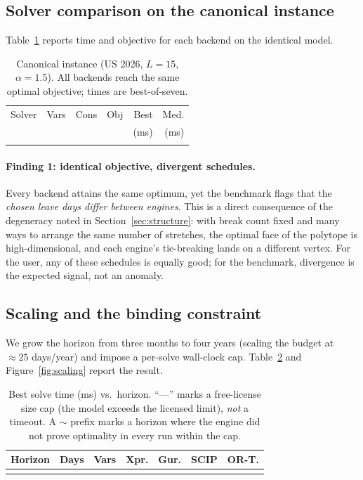 \documentclass[10pt,twocolumn]{article}
\begin{document}
\subsection{Solver comparison on the canonical instance}
Table~\ref{tab:comparison} reports time and objective for each backend on the
identical model.

\begin{table}[t]
  \centering
  \caption{Canonical instance (US 2026, $L=15$, $\alpha=1.5$). All backends
  reach the same optimal objective; times are best-of-seven.}
  \label{tab:comparison}
  \small
  \begin{tabular}{lrrrrr}
    \toprule
    Solver & Vars & Cons & Obj & Best & Med.\\
           &      &      &     & (ms) & (ms)\\
    \midrule
     \\
    \bottomrule
  \end{tabular}
\end{table}

\paragraph{Finding 1: identical objective, divergent schedules.}
Every backend attains the same optimum, yet the benchmark flags that the
\emph{chosen leave days differ between engines}. This is a direct consequence of
the degeneracy noted in Section~\ref{sec:structure}: with break count fixed and
many ways to arrange the same number of stretches, the optimal face of the
polytope is high-dimensional, and each engine's tie-breaking lands on a
different vertex. For the user, any of these schedules is equally good; for the
benchmark, divergence is the expected signal, not an anomaly.

\subsection{Scaling and the binding constraint}
We grow the horizon from three months to four years (scaling the budget at
$\approx 25$ days/year) and impose a per-solve wall-clock cap.
Table~\ref{tab:scaling} and Figure~\ref{fig:scaling} report the result.

\begin{table}[t]
  \centering
  \caption{Best solve time (ms) vs.\ horizon. ``---'' marks a free-license size
  cap (the model exceeds the licensed limit), \emph{not} a timeout. A
  $\sim$ prefix marks a horizon where the engine did not prove optimality in
  every run within the cap.}
  \label{tab:scaling}
  \small
  \setlength{\tabcolsep}{4pt}
  \begin{tabular}{lrrrrrr}
    \toprule
    Horizon & Days & Vars & Xpr. & Gur. & SCIP & OR-T.\\
    \midrule
     \\
    \bottomrule
  \end{tabular}
\end{table}
\end{document}
